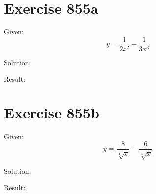 \documentclass[a4paper, 10pt]{scrartcl}
\begin{document}
\section{Exercise 855a}

Given:
\[
y = \frac{1}{2x^{2}} - \frac{1}{3x^{3}}
\]

Solution:

Result:

\section{Exercise 855b}

Given:
\[
y = \frac{8}{\sqrt[4]{x}} - \frac{6}{\sqrt[3]{x}}
\]

Solution:

Result:
\end{document}
